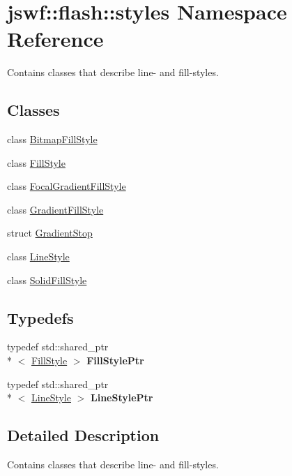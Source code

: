\hypertarget{namespacejswf_1_1flash_1_1styles}{\section{jswf\+:\+:flash\+:\+:styles Namespace Reference}
\label{namespacejswf_1_1flash_1_1styles}
}


Contains classes that describe line-\/ and fill-\/styles.  


\subsection*{Classes}
\begin{DoxyCompactItemize}
\item 
class \hyperlink{classjswf_1_1flash_1_1styles_1_1_bitmap_fill_style}{Bitmap\+Fill\+Style}
\item 
class \hyperlink{classjswf_1_1flash_1_1styles_1_1_fill_style}{Fill\+Style}
\item 
class \hyperlink{classjswf_1_1flash_1_1styles_1_1_focal_gradient_fill_style}{Focal\+Gradient\+Fill\+Style}
\item 
class \hyperlink{classjswf_1_1flash_1_1styles_1_1_gradient_fill_style}{Gradient\+Fill\+Style}
\item 
struct \hyperlink{structjswf_1_1flash_1_1styles_1_1_gradient_stop}{Gradient\+Stop}
\item 
class \hyperlink{classjswf_1_1flash_1_1styles_1_1_line_style}{Line\+Style}
\item 
class \hyperlink{classjswf_1_1flash_1_1styles_1_1_solid_fill_style}{Solid\+Fill\+Style}
\end{DoxyCompactItemize}
\subsection*{Typedefs}
\begin{DoxyCompactItemize}
\item 
\hypertarget{namespacejswf_1_1flash_1_1styles_a03ec5ce6d1b8c6dc322eb39539cb4580}{typedef std\+::shared\+\_\+ptr\\*
$<$ \hyperlink{classjswf_1_1flash_1_1styles_1_1_fill_style}{Fill\+Style} $>$ {\bfseries Fill\+Style\+Ptr}}\label{namespacejswf_1_1flash_1_1styles_a03ec5ce6d1b8c6dc322eb39539cb4580}

\item 
\hypertarget{namespacejswf_1_1flash_1_1styles_aac9de90873ec0ba6369febcb42d1a829}{typedef std\+::shared\+\_\+ptr\\*
$<$ \hyperlink{classjswf_1_1flash_1_1styles_1_1_line_style}{Line\+Style} $>$ {\bfseries Line\+Style\+Ptr}}\label{namespacejswf_1_1flash_1_1styles_aac9de90873ec0ba6369febcb42d1a829}

\end{DoxyCompactItemize}


\subsection{Detailed Description}
Contains classes that describe line-\/ and fill-\/styles. 